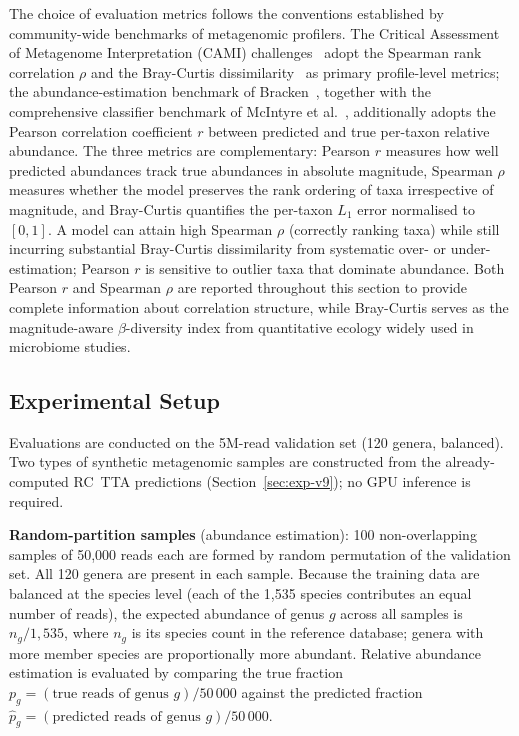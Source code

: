 The choice of evaluation metrics follows the conventions established by community-wide benchmarks of metagenomic profilers.
The Critical Assessment of Metagenome Interpretation (CAMI) challenges~\cite{Sczyrba2017,Meyer2022cami2} adopt the Spearman rank correlation $\rho$ and the Bray-Curtis dissimilarity~\cite{BrayCurtis1957} as primary profile-level metrics; the abundance-estimation benchmark of Bracken~\cite{Lu2017}, together with the comprehensive classifier benchmark of McIntyre et al.~\cite{McIntyre2017}, additionally adopts the Pearson correlation coefficient $r$ between predicted and true per-taxon relative abundance.
The three metrics are complementary: Pearson $r$ measures how well predicted abundances track true abundances in absolute magnitude, Spearman $\rho$ measures whether the model preserves the rank ordering of taxa irrespective of magnitude, and Bray-Curtis quantifies the per-taxon $L_1$ error normalised to $[0, 1]$.
A model can attain high Spearman $\rho$ (correctly ranking taxa) while still incurring substantial Bray-Curtis dissimilarity from systematic over- or under-estimation; Pearson $r$ is sensitive to outlier taxa that dominate abundance.
Both Pearson $r$ and Spearman $\rho$ are reported throughout this section to provide complete information about correlation structure, while Bray-Curtis serves as the magnitude-aware $\beta$-diversity index from quantitative ecology widely used in microbiome studies.

\subsection{Experimental Setup}

Evaluations are conducted on the 5M-read validation set (120 genera, balanced).
Two types of synthetic metagenomic samples are constructed from the already-computed RC~TTA predictions (Section~\ref{sec:exp-v9}); no GPU inference is required.

\textbf{Random-partition samples} (abundance estimation): 100 non-overlapping samples of 50,000 reads each are formed by random permutation of the validation set.
All 120 genera are present in each sample.
Because the training data are balanced at the species level (each of the 1,535 species contributes an equal number of reads), the expected abundance of genus $g$ across all samples is $n_g / 1{,}535$, where $n_g$ is its species count in the reference database; genera with more member species are proportionally more abundant.
Relative abundance estimation is evaluated by comparing the true fraction $p_g = (\text{true reads of genus } g) / 50\,000$ against the predicted fraction $\hat{p}_g = (\text{predicted reads of genus } g) / 50\,000$.

